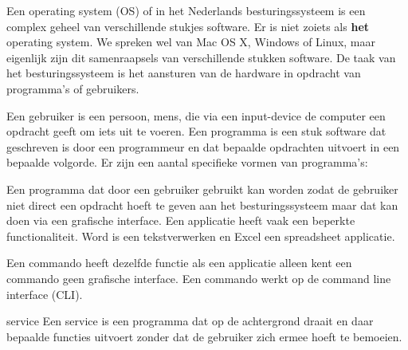 Een operating system (OS) of in het Nederlands besturingssysteem is een complex geheel van verschillende stukjes software. Er is niet zoiets als \textbf{het} operating system. We spreken wel van Mac OS X, Windows of Linux, maar eigenlijk zijn dit samenraapsels van verschillende stukken software. De taak van het besturingssysteem is het aansturen van de hardware in opdracht van programma's of gebruikers.

Een gebruiker is een persoon, mens, die via een input-device de computer een opdracht geeft om iets uit te voeren. Een programma is een stuk software dat geschreven is door een programmeur en dat bepaalde opdrachten uitvoert in een bepaalde volgorde. Er zijn een aantal specifieke vormen van programma's:
\begin{description}
	\item[Applicatie] Een programma dat door een gebruiker gebruikt kan worden zodat de gebruiker niet direct een opdracht hoeft te geven aan het besturingssysteem maar dat kan doen via een grafische interface. Een applicatie heeft vaak een beperkte functionaliteit. Word is een tekstverwerken en Excel een spreadsheet applicatie.
	\item[Commando] Een commando heeft dezelfde functie als een applicatie alleen kent een commando geen grafische interface. Een commando werkt op de command line interface (CLI).
	\item[Service]\item{service} Een service is een programma dat op de achtergrond draait en daar bepaalde functies uitvoert zonder dat de gebruiker zich ermee hoeft te bemoeien.
\end{description}

